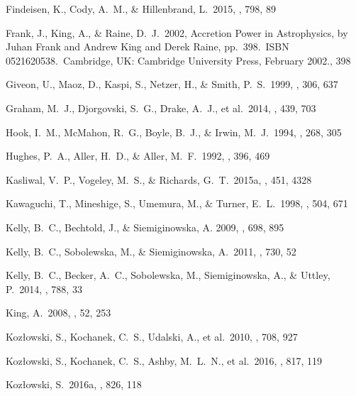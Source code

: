 \documentclass[twocolumn]{aastex6}
\begin{document}
\begin{thebibliography}{}
 Findeisen, K., Cody, A.~M., \& Hillenbrand, L.\ 2015, \apj, 798, 89 

 Frank, J., King, A., \& Raine, D.~J.\ 2002, Accretion Power in Astrophysics, by Juhan Frank and Andrew King and Derek Raine, pp.~398.~ISBN 0521620538.~Cambridge, UK: Cambridge University Press, February 2002., 398

 Giveon, U., Maoz, D., Kaspi, S., Netzer, H., \& Smith, P.~S.\ 1999, \mnras, 306, 637 

 Graham, M.~J., Djorgovski, S.~G., Drake, A.~J., et al.\ 2014, \mnras, 439, 703

 Hook, I.~M., McMahon, R.~G., Boyle, B.~J., \& Irwin, M.~J.\ 1994, \mnras, 268, 305 

 Hughes, P.~A., Aller, H.~D., \& Aller, M.~F.\ 1992, \apj, 396, 469 

 Kasliwal, V.~P., Vogeley, M.~S., \& Richards, G.~T.\ 2015a, \mnras, 451, 4328 

 Kawaguchi, T., Mineshige, S., Umemura, M., \& Turner, E.~L.\ 1998, \apj, 504, 671 

 Kelly, B.~C., Bechtold, J., \& Siemiginowska, A. 2009, \apj, 698, 895

 Kelly, B.~C., Sobolewska, M., \& Siemiginowska, A.\ 2011, \apj, 730, 52 

 Kelly, B.~C., Becker, A.~C., Sobolewska, M., Siemiginowska, A., \& Uttley, P.\ 2014, \apj, 788, 33 

 King, A.\ 2008, \nar, 52, 253 

 Koz{\l}owski, S., Kochanek, C.~S., Udalski, A., et al.\ 2010, \apj, 708, 927

 Koz{\l}owski, S., Kochanek, C.~S., Ashby, M.~L.~N., et al.\ 2016, \apj, 817, 119 

 Koz{\l}owski, S.\ 2016a, \apj, 826, 118 


\end{thebibliography}
\end{document}
